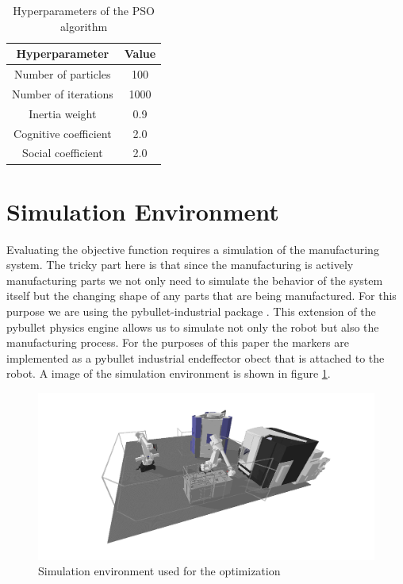 \documentclass{svproc}
\begin{document}
\begin{table}  %
        \centering
        \begin{tabular}{c|c}
                Hyperparameter & Value \\
                \hline
                Number of particles & 100 \\
                Number of iterations & 1000 \\
                Inertia weight & 0.9 \\
                Cognitive coefficient & 2.0 \\
                Social coefficient & 2.0 \\
        \end{tabular}
        \caption{Hyperparameters of the PSO algorithm}
        \label{tab:hyperparameters}
\end{table}

\section{Simulation Environment}
Evaluating the objective function requires a simulation of the manufacturing system.
The tricky part here is that since the manufacturing is actively manufacturing parts we not only need to simulate the behavior of the system itself but the changing shape of any parts that are being manufactured.
For this purpose we are using the pybullet-industrial package \cite{pybullet_industrial}.
This extension of the pybullet physics engine allows us to simulate not only the robot but also the manufacturing process.
For the purposes of this paper the markers are implemented as a pybullet industrial endeffector obect that is attached to the robot.
A image of the simulation environment is shown in figure \ref{fig:simulation}.
\begin{figure}
        \centering
        \includegraphics[width=\textwidth]{figures/simulation.png}
        \caption{Simulation environment used for the optimization}
        \label{fig:simulation}
\end{figure}
\end{document}
